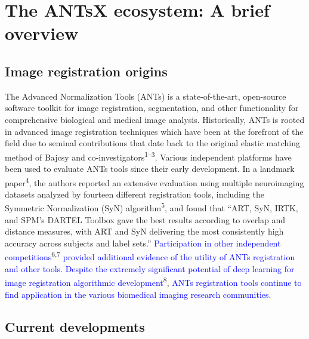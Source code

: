 \documentclass[12pt,]{article}
\begin{document}
\newpage

\hypertarget{the-antsx-ecosystem-a-brief-overview}{%
\section*{The ANTsX ecosystem: A brief
overview}\label{the-antsx-ecosystem-a-brief-overview}}

\hypertarget{image-registration-origins}{%
\subsection*{Image registration
origins}\label{image-registration-origins}}

The Advanced Normalization Tools (ANTs) is a state-of-the-art,
open-source software toolkit for image registration, segmentation, and
other functionality for comprehensive biological and medical image
analysis. Historically, ANTs is rooted in advanced image registration
techniques which have been at the forefront of the field due to seminal
contributions that date back to the original elastic matching method of
Bajcsy and co-investigators\textsuperscript{1--3}. Various independent
platforms have been used to evaluate ANTs tools since their early
development. In a landmark paper\textsuperscript{4}, the authors
reported an extensive evaluation using multiple neuroimaging datasets
analyzed by fourteen different registration tools, including the
Symmetric Normalization (SyN) algorithm\textsuperscript{5}, and found
that ``ART, SyN, IRTK, and SPM's DARTEL Toolbox gave the best results
according to overlap and distance measures, with ART and SyN delivering
the most consistently high accuracy across subjects and label sets.''
\textcolor{blue}{Participation in other independent competitions}\textsuperscript{6,7}
\textcolor{blue}{provided additional evidence of
the utility of ANTs registration and other tools.  Despite the extremely
significant potential of deep learning for image registration algorithmic
development}\textsuperscript{8},
\textcolor{blue}{ANTs registration tools
continue to find application in the various biomedical imaging research
communities.}

\hypertarget{current-developments}{%
\subsection*{Current developments}\label{current-developments}}
\end{document}
